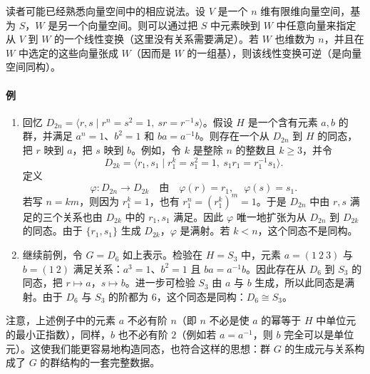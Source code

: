 读者可能已经熟悉向量空间中的相应说法。设 $V$ 是一个 $n$ 维有限维向量空间，基为 $S$，$W$ 是另一个向量空间。则可以通过把 $S$ 中元素映到 $W$ 中任意向量来指定从 $V$ 到 $W$ 的一个线性变换（这里没有关系需要满足）。若 $W$ 也维数为 $n$，并且在 $W$ 中选定的这些向量张成 $W$（因而是 $W$ 的一组基），则该线性变换可逆（是向量空间同构）。

\paragraph{例}
\begin{enumerate}[label=(\arabic*)]
  \item 回忆 $D_{2n}=\langle r,s\mid r^n=s^2=1,\ sr=r^{-1}s\rangle$。假设 $H$ 是一个含有元素 $a,b$ 的群，并满足 $a^n=1$、$b^2=1$ 和 $ba=a^{-1}b$。则存在一个从 $D_{2n}$ 到 $H$ 的同态，把 $r$ 映到 $a$，把 $s$ 映到 $b$。例如，令 $k$ 是整除 $n$ 的整数且 $k\geq3$，并令
  \[
    D_{2k}=\langle r_1,s_1\mid r_1^k=s_1^2=1,\ s_1r_1=r_1^{-1}s_1\rangle.
  \]
  定义
  \[
    \varphi:D_{2n}\to D_{2k}\quad\text{由}\quad \varphi(r)=r_1,
    \quad \varphi(s)=s_1.
  \]
  若写 $n=km$，则因为 $r_1^k=1$，也有 $r_1^n=(r_1^k)^m=1$。于是 $D_{2n}$ 中由 $r,s$ 满足的三个关系也由 $D_{2k}$ 中的 $r_1,s_1$ 满足。因此 $\varphi$ 唯一地扩张为从 $D_{2n}$ 到 $D_{2k}$ 的同态。由于 $\{r_1,s_1\}$ 生成 $D_{2k}$，$\varphi$ 是满射。若 $k<n$，这个同态不是同构。
  \item 继续前例，令 $G=D_6$ 如上表示。检验在 $H=S_3$ 中，元素 $a=(1\ 2\ 3)$ 与 $b=(1\ 2)$ 满足关系：$a^3=1$、$b^2=1$ 且 $ba=a^{-1}b$。因此存在从 $D_6$ 到 $S_3$ 的同态，把 $r\mapsto a$，$s\mapsto b$。进一步可检验 $S_3$ 由 $a$ 与 $b$ 生成，所以此同态是满射。由于 $D_6$ 与 $S_3$ 的阶都为 $6$，这个同态是同构：$D_6\cong S_3$。
\end{enumerate}

注意，上述例子中的元素 $a$ 不必有阶 $n$（即 $n$ 不必是使 $a$ 的幂等于 $H$ 中单位元的最小正指数），同样，$b$ 也不必有阶 $2$（例如若 $a=a^{-1}$，则 $b$ 完全可以是单位元）。这使我们能更容易地构造同态，也符合这样的思想：群 $G$ 的生成元与关系构成了 $G$ 的群结构的一套完整数据。

